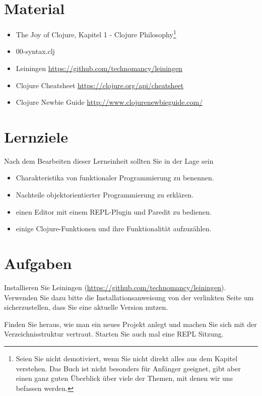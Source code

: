 \documentclass[11pt,a4paper]{article}
\begin{document}
	\section{Material} 
	
	\begin{itemize}
		\item The Joy of Clojure, Kapitel 1 - Clojure Philosophy\footnote{Seien Sie nicht demotiviert, wenn Sie nicht direkt alles aus dem Kapitel verstehen. Das Buch ist nicht besonders f\"ur Anf\"anger geeignet, gibt aber einen ganz guten \"Uberblick \"uber viele der Themen, mit denen wir uns befassen werden.}
		\item 00-syntax.clj
		\item Leiningen \url{https://github.com/technomancy/leiningen}
		\item Clojure Cheatsheet \url{https://clojure.org/api/cheatsheet}
		\item Clojure Newbie Guide \url{http://www.clojurenewbieguide.com/}
	\end{itemize}
	
	
	\section{Lernziele}
	
	Nach dem Bearbeiten dieser Lerneinheit sollten Sie in der Lage sein
	
	\begin{itemize}
		\item Charakteristika von funktionaler Programmierung zu benennen.
		\item Nachteile objektorientierter Programmierung zu erkl\"aren.
		\item einen Editor mit einem REPL-Plugin und Paredit zu bedienen.
		\item einige Clojure-Funktionen und ihre Funktionalität aufzuzählen.
	\end{itemize}
	
	\section{Aufgaben}
	
	
	\begin{aufgabe}[Leiningen]
		Installieren Sie Leiningen (\url{https://github.com/technomancy/leiningen}).
		Verwenden Sie dazu bitte die Installationsanweisung von der verlinkten Seite
		um sicherzustellen, dass Sie eine aktuelle Version nutzen.
		
		Finden Sie heraus, wie man ein neues Projekt anlegt
		und machen Sie sich mit der Ver\-zeich\-nis\-struk\-tur vertraut.
		Starten Sie auch mal eine REPL Sitzung.
	\end{aufgabe}
	
\end{document}
